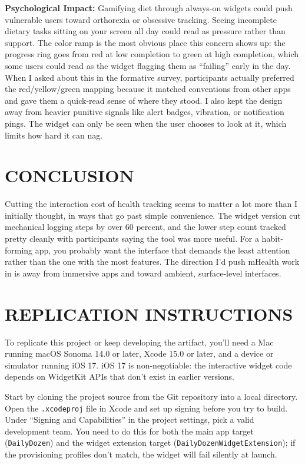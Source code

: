 \documentclass[10pt,twocolumn]{article}
\begin{document}
\noindent\textbf{Psychological Impact:} Gamifying diet through always-on widgets could push vulnerable users toward orthorexia or obsessive tracking.\cite{HayesSirensCall} Seeing incomplete dietary tasks sitting on your screen all day could read as pressure rather than support. The color ramp is the most obvious place this concern shows up: the progress ring goes from red at low completion to green at high completion, which some users could read as the widget flagging them as ``failing'' early in the day. When I asked about this in the formative survey, participants actually preferred the red/yellow/green mapping because it matched conventions from other apps and gave them a quick-read sense of where they stood. I also kept the design away from heavier punitive signals like alert badges, vibration, or notification pings. The widget can only be seen when the user chooses to look at it, which limits how hard it can nag.

\section{CONCLUSION}

Cutting the interaction cost of health tracking seems to matter a lot more than I initially thought, in ways that go past simple convenience. The widget version cut mechanical logging steps by over 60 percent, and the lower step count tracked pretty cleanly with participants saying the tool was more useful. For a habit-forming app, you probably want the interface that demands the least attention rather than the one with the most features. The direction I'd push mHealth work in is away from immersive apps and toward ambient, surface-level interfaces.

\section{REPLICATION INSTRUCTIONS}

To replicate this project or keep developing the artifact, you'll need a Mac running macOS Sonoma 14.0 or later, Xcode 15.0 or later, and a device or simulator running iOS 17. iOS 17 is non-negotiable: the interactive widget code depends on WidgetKit APIs that don't exist in earlier versions.

Start by cloning the project source from the Git repository into a local directory. Open the \texttt{.xcodeproj} file in Xcode and set up signing before you try to build. Under ``Signing and Capabilities'' in the project settings, pick a valid development team. You need to do this for both the main app target (\texttt{DailyDozen}) and the widget extension target (\texttt{DailyDozenWidgetExtension}); if the provisioning profiles don't match, the widget will fail silently at launch.
\end{document}
